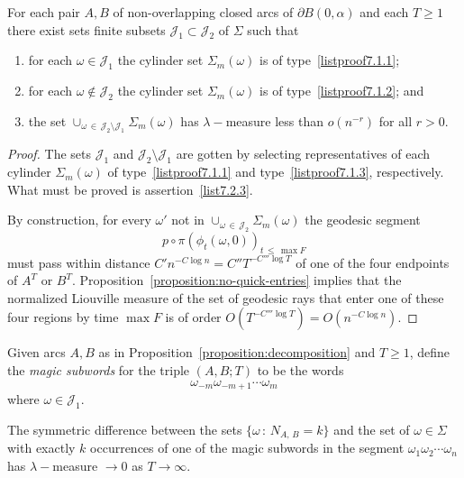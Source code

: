 \documentclass[AHL, Unicode, longabstracts, published]{cedram}
\newcommand*{\Alphenumi}{\renewcommand*{\theenumi}{\Alph{enumi}}}
\begin{document}
\begin{prop}\label{proposition:decomposition}
For each pair $A,B$ of non-overlapping closed arcs of $\partial B (0,\alpha)$ and each $T\geq 1$ there exist sets finite subsets $\mathcal{J}_{1}\subset \mathcal{J}_{2}$ of $\Sigma$ such that
\begin{enumerate}\Alphenumi
\item  \label{list7.2.1}for each $\omega \in\mathcal{J}_{1}$ the cylinder set $\Sigma_{m}(\omega)$ is of type~\eqref{listproof7.1.1};
\item \label{list7.2.2} for each $\omega \not\in\mathcal{J}_{2}$ the cylinder set $\Sigma_{m}(\omega)$ is of type~\eqref{listproof7.1.2}; and
\item \label{list7.2.3} the set $\cup_{\omega\,\in\, \mathcal{J}_{2}\setminus\mathcal{J}_{1}}\Sigma_{m}(\omega)$ has $\lambda-$measure less than $o(n^{-r})$ for all $r>0$.
\end{enumerate}
\end{prop}

\begin{proof}
The sets $\mathcal{J}_{1}$ and $\mathcal{J}_{2}\setminus
\mathcal{J}_{1}$ are gotten by selecting representatives of each cylinder $\Sigma_{m}(\omega)$ of type~\eqref{listproof7.1.1} and type~\eqref{listproof7.1.3}, respectively. What must be proved is assertion~\eqref{list7.2.3}.

By construction, for every $\omega '$ not in $\cup_{\omega\,\in\,\mathcal{J}_{2}}\Sigma_{m}(\omega)$ the geodesic segment
\[
p\circ\pi (\phi_{t}(\omega,0))_{t\,\leq\,\max F}
\]
must pass within distance $C'n^{-C\log n}=C'' T ^{-C''' \log T}$ of one of the four endpoints of $A^{T}$ or $B^{T}$. Proposition~\ref{proposition:no-quick-entries} implies that the normalized Liouville measure of the set of geodesic rays that enter one of these four regions by time $\max F$ is of order $O(T ^{-C''' \log T})=O(n^{-C \log n})$.
\end{proof}

\begin{defi}\label{definition:magicSubwords}
Given arcs $A,B$ as in Proposition~\ref{proposition:decomposition} and $T\geq 1$, define the \emph{magic subwords} for the triple $(A,B;T)$ to be the words
\[
\omega_{-m}\omega_{-m+1}\cdots \omega_{m}
\]
where $\omega \in \mathcal{J}_{1}$.
\end{defi}

\begin{coro}\label{corollary:magicSubwordCounts}
The symmetric difference between the sets $\{\omega \,:\, N_{A,\,B}=k\}$ and the set of $\omega \in \Sigma$ with exactly $k$ occurrences of one of the magic subwords in the segment $\omega_{1}\omega_{2}\dotsb \omega_{n}$ has $\lambda -$measure $\rightarrow 0$ as $T \rightarrow\infty$.
\end{coro}
\end{document}

